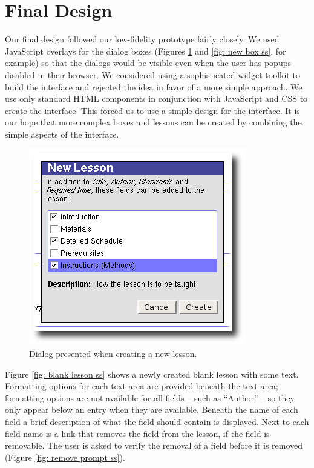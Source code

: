 \documentclass[10pt,letter]{article}
\begin{document}
\section{Final Design}
Our final design followed our low-fidelity prototype fairly closely. We used
JavaScript overlays for the dialog boxes (Figures \ref{fig: new lesson ss} and
\ref{fig: new box ss}, for example) so that the dialogs would be visible even
when the user has popups disabled in their browser. We considered using a
sophisticated widget toolkit to build the interface and rejected the idea in
favor of a more simple approach. We use only standard HTML components in
conjunction with JavaScript and CSS to create the interface. This forced us to
use a simple design for the interface. It is our hope that more complex boxes
and lessons can be created by combining the simple aspects of the interface.

\begin{figure}[htb]
	\centering
	\includegraphics[width=0.45\linewidth]{figures/new_lesson}
	\caption{Dialog presented when creating a new lesson.}
	\label{fig: new lesson ss}
\end{figure}

Figure \ref{fig: blank lesson ss} shows a newly created blank lesson with some
text. Formatting options for each text area are provided beneath the text area;
formatting options are not available for all fields -- such as ``Author'' -- so
they only appear below an entry when they are available. Beneath the name of
each field a brief description of what the field should contain is displayed.
Next to each field name is a link that removes the field from the lesson, if the
field is removable. The user is asked to verify the removal of a field before it
is removed (Figure \ref{fig: remove prompt ss}).
\end{document}
